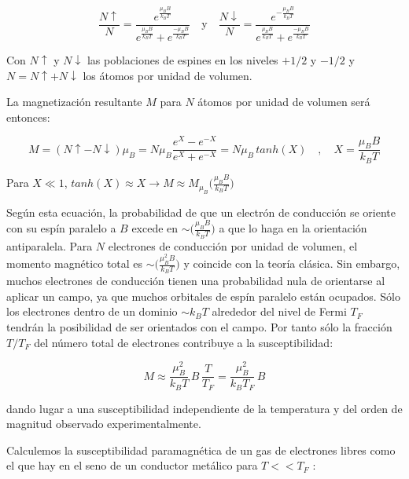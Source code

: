 \begin{equation}
\frac{N\uparrow}{N}=\frac{e^{\frac{\mu_{B}B}{k_{B}T}}}{e^{\frac{\mu_{B}B}{k_{B}T}}+e^{\frac{-\mu_{B}B}{k_{B}T}}} \quad \text{y} \quad \frac{N\downarrow}{N}=\frac{e^{-\frac{\mu_{B}B}{k_{B}T}}}{e^{\frac{\mu_{B}B}{k_{B}T}}+e^{\frac{-\mu_{B}B}{k_{B}T}}}
\end{equation}

Con $N\uparrow$ y $N\downarrow$ las poblaciones de espines en los niveles $+1/2$ y $-1/2$ y $N=N\uparrow+N\downarrow$ los átomos por unidad de volumen.

La magnetización resultante $M$ para $N$ átomos por unidad de volumen será entonces:

\begin{equation}
M=(N\uparrow-N\downarrow)\mu_{B}=N\mu_{B}\frac{e^{X}-e^{-X}}{e^{X}+e^{-X}}=N\mu_{B}\,tanh(X) \quad,\quad  X=\frac{\mu_{B}B}{k_{B}T}
\end{equation}

Para $X\ll1$, $tanh(X)\approx X \longrightarrow M\approx M_{\mu_{B}}\big(\frac{\mu_{B}B}{k_{B}T}\big)$

Según esta ecuación, la probabilidad de que un electrón de conducción se oriente con su espín paralelo a $B$ excede en $\sim\big(\frac{\mu_{B}B}{k_{B}T}\big)$ a que lo haga en la orientación antiparalela. Para $N$ electrones de conducción por unidad de volumen, el momento magnético total es $\sim \big( \frac{\mu_{B}^{2}B}{k_{B}T}\big)$ y coincide con la teoría clásica. Sin embargo, muchos electrones de conducción tienen una probabilidad nula de orientarse al aplicar un campo, ya que muchos orbitales de espín paralelo están ocupados. Sólo los electrones dentro de un dominio $\sim k_{B} T$ alrededor del nivel de Fermi $T_{F}$ tendrán la posibilidad de ser orientados con el campo. Por tanto sólo la fracción $T/T_{F}$ del número total de electrones contribuye a la susceptibilidad:

\begin{equation}
 M \approx \frac{\mu_{B}^{2}}{k_{B}T}\, B\, \frac{T}{T_{F}} = \frac{\mu_{B}^{2}}{k_{B}T_{F}}\, B
\end{equation}

dando lugar a una susceptibilidad independiente de la temperatura y del orden de magnitud observado experimentalmente.

Calculemos la susceptibilidad paramagnética de un gas de electrones libres como el que hay en el seno de un
conductor metálico para $T << T_{F}$ :




